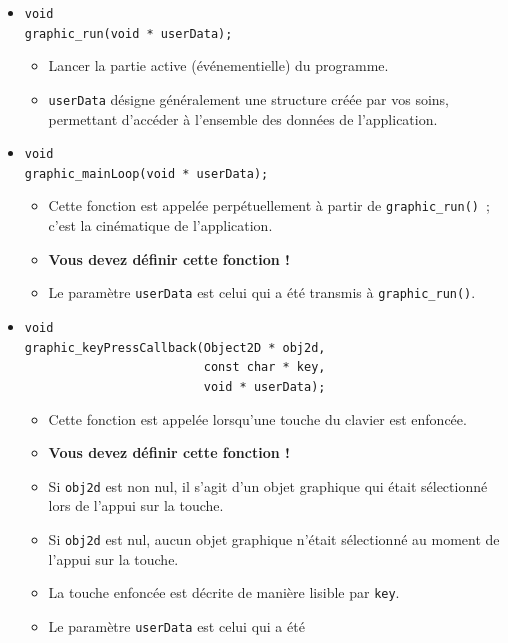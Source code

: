 \documentclass[12pt]{article}
\begin{document}
\begin{itemize}
\item \verb!void! \\
      \verb!graphic_run(void * userData);!
      \begin{itemize}
      \item Lancer la partie active (\'ev\'enementielle) du programme.
      \item \verb!userData! d\'esigne g\'en\'eralement une structure
            cr\'e\'ee par vos soins, permettant d'acc\'eder \`a l'ensemble
            des donn\'ees de l'application.
      \end{itemize}
\item \verb!void! \\
      \verb!graphic_mainLoop(void * userData);!
      \begin{itemize}
      \item Cette fonction est appel\'ee perp\'etuellement \`a partir
            de \verb!graphic_run()!~; c'est la cin\'ematique de l'application.
      \item \textbf{Vous devez d\'efinir cette fonction !}
      \item Le param\`etre \verb!userData! est celui qui a \'et\'e
            transmis \`a \verb!graphic_run()!.
      \end{itemize}
\item \verb!void! \\
      \verb!graphic_keyPressCallback(Object2D * obj2d,! \\
      \verb!                         const char * key,! \\
      \verb!                         void * userData);!
      \begin{itemize}
      \item Cette fonction est appel\'ee lorsqu'une touche du clavier est
            enfonc\'ee.
      \item \textbf{Vous devez d\'efinir cette fonction !}
      \item Si \verb!obj2d! est non nul, il s'agit d'un objet graphique
            qui \'etait s\'electionn\'e lors de l'appui sur la touche.
      \item Si \verb!obj2d! est nul, aucun objet graphique n'\'etait
            s\'electionn\'e au moment de l'appui sur la touche.
      \item La touche enfonc\'ee est d\'ecrite de mani\`ere lisible par
            \verb!key!.
      \item Le param\`etre \verb!userData! est celui qui a \'et\'e

\end{itemize}
\end{itemize}
\end{document}
